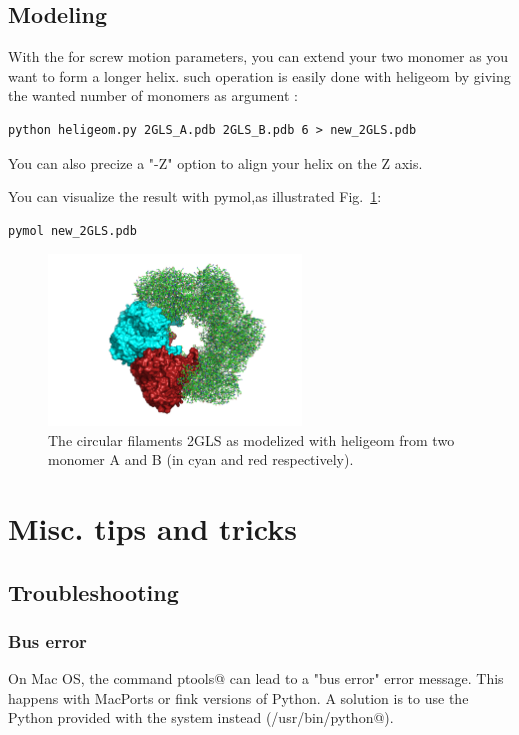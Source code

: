 \documentclass[12pt,a4paper]{article}
\begin{document}
\subsection{Modeling}
With the for screw motion parameters, you can extend your two monomer as you want to form a longer helix. such operation is easily done with heligeom by giving the wanted number of monomers as argument :
      
\begin{verbatim}
python heligeom.py 2GLS_A.pdb 2GLS_B.pdb 6 > new_2GLS.pdb
\end{verbatim}
You can also precize a "-Z" option to align your helix on the Z axis.

You can visualize the result with pymol,as illustrated Fig.~\ref{2gls}:
\begin{verbatim}
pymol new_2GLS.pdb
\end{verbatim}

\begin{figure}[htbp]
\center
\includegraphics*[width=0.60\textwidth]{img/2GLS.png}
\caption{The circular filaments 2GLS as modelized with heligeom from two monomer A and B (in cyan and red respectively).}
\label{2gls}
\end{figure}
\newpage
\section{Misc. tips and tricks}


\subsection{Troubleshooting}

\subsubsection{Bus error}

On Mac OS, the command \verb@import ptools@ can lead to a "bus error" 
error message. This happens with MacPorts or fink versions of Python. 
A solution is to use the Python provided with the system instead 
(\verb@/usr/bin/python@).
\end{document}
